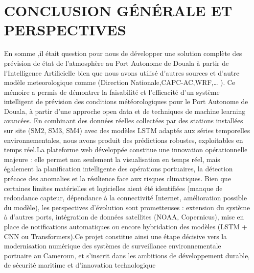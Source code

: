 \documentclass[a4paper,12pt,openany]{report}
\begin{document}
\chapter*{ CONCLUSION GÉNÉRALE ET PERSPECTIVES }
\vspace{1cm}
\label{chap:conclusion}
	
		\quad En somme ,il était question pour nous de développer une solution complète des prévision de état de l'atmosphère  au Port Autonome de Douala  à partir de l’Intelligence Artificielle bien que nous avons utilisé d’autres sources et d’autre  modèle meteorologique comme (Direction Nationale,CAPC-AC,WRF,… ). Ce mémoire a permis de démontrer la faisabilité et l’efficacité d’un système intelligent de prévision des conditions météorologiques pour le Port Autonome de Douala, à partir d’une approche open data et de techniques de machine learning avancées. En combinant des données réelles collectées par des stations installées sur site (SM2, SM3, SM4) avec des modèles LSTM adaptés aux séries temporelles environnementales, nous avons produit des prédictions robustes, exploitables en temps réel.La plateforme web développée constitue une innovation opérationnelle majeure : elle permet non seulement la visualisation en temps réel, mais également la planification intelligente des opérations portuaires, la détection précoce des anomalies et la résilience face aux risques climatiques.
		Bien que certaines limites matérielles et logicielles aient été identifiées (manque de redondance capteur, dépendance à la connectivité Internet, amélioration possible du modèle), les perspectives d’évolution sont prometteuses : extension du système à d’autres ports, intégration de données satellites (NOAA, Copernicus), mise en place de notifications automatiques ou encore hybridation des modèles (LSTM + CNN ou Transformers).Ce projet constitue ainsi une étape décisive vers la modernisation numérique des systèmes de surveillance environnementale portuaire au Cameroun, et s’inscrit dans les ambitions de développement durable, de sécurité maritime et d’innovation technologique
		

		\label{ch:Conclusiongénérale et perspectives} %
		\newpage
	\label{RéférencesBibliographiques}
\end{document}
